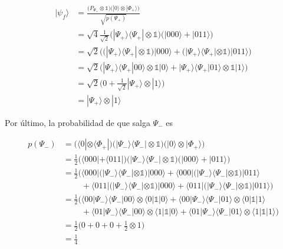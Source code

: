 \documentclass{article}
\begin{document}
\begin{align*}
  |\psi_f\rangle &= \frac
    {\Big(P_{\Psi_+} \otimes \mathbb{1}\Big)
    \Big(|0\rangle\otimes|\Phi_+\rangle\Big)}
    {\sqrt{p(\Psi_+)}} \\ 
  &= \sqrt{4}\frac{1}{\sqrt{2}}
    \Big(|\Psi_+\rangle\langle \Psi_+| \otimes \mathbb{1}\Big)
    \Big(|000\rangle + |011\rangle\Big) \\
  &= \sqrt{2}\Big(
  \big(|\Psi_+\rangle\langle \Psi_+| \otimes \mathbb{1}\big)|000
    \rangle +
  \big(|\Psi_+\rangle\langle \Psi_+| \otimes \mathbb{1}\big)|011
    \rangle
  \Big) \\ 
  &= \sqrt{2}\Big(
  |\Psi_+\rangle\langle \Psi_+|00\rangle \otimes 
    \mathbb{1}|0\rangle +
  |\Psi_+\rangle\langle \Psi_+|01\rangle \otimes 
    \mathbb{1}|1\rangle
  \Big) \\ 
  &= \sqrt{2}\Big(
    0 + \frac{1}{\sqrt{2}}|\Psi_+\rangle \otimes |1 \rangle
  \Big) \\ 
  &= |\Psi_+\rangle \otimes |1 \rangle
\end{align*}

Por último, la probabilidad de que salga $\Psi_-$ es

\begin{align*}
  p(\Psi_-) 
    &= \Big(\langle 0| \otimes \langle \Phi_+|\Big)
       \Big(|\Psi_-\rangle\langle\Psi_-|\otimes \mathbb{1}\Big)  
       \Big(|0\rangle \otimes |\Phi_+\rangle\Big) \\
    &= \frac{1}{2}
    \Big(\langle 000| + \langle 011|\Big)
    \Big(|\Psi_-\rangle\langle \Psi_-| \otimes \mathbb{1}\Big)
    \Big(|000\rangle + |011\rangle\Big) \\
    &= \frac{1}{2}
      \Big(\langle 000|
        \big(|\Psi_- \rangle\langle \Psi_-|\otimes \mathbb{1}\big)
      |000\rangle +
      \langle 000|
        \big(|\Psi_- \rangle\langle \Psi_-|\otimes \mathbb{1}\big)
      |011\rangle \\ &\;\;\;\;\;\;\;\;+
      \langle 011|
        \big(|\Psi_- \rangle\langle \Psi_-|\otimes \mathbb{1}\big)
      |000\rangle +
      \langle 011|
        \big(|\Psi_- \rangle\langle \Psi_-|\otimes \mathbb{1}\big)
      |011\rangle
    \Big) \\
    &= \frac{1}{2}\Big(
      \langle 00|\Psi_- \rangle\langle \Psi_-|00\rangle
      \otimes 
      \langle 0|\mathbb{1}|0\rangle +
      \langle 00|\Psi_- \rangle\langle \Psi_-|01\rangle
      \otimes 
      \langle 0|\mathbb{1}|1\rangle \\ &\;\;\;\;\;\;\;\;+
      \langle 01|\Psi_- \rangle\langle \Psi_-|00\rangle
      \otimes 
      \langle 1|\mathbb{1}|0\rangle +
      \langle 01|\Psi_- \rangle\langle \Psi_-|01\rangle
      \otimes 
      \langle 1|\mathbb{1}|1\rangle
      \Big) \\ 
   &= \frac{1}{2}\Big(
      0 + 0 + 0 + \frac{1}{2} \otimes 1
      \Big) \\ 
   &= \frac{1}{4} 
\end{align*}
\end{document}

